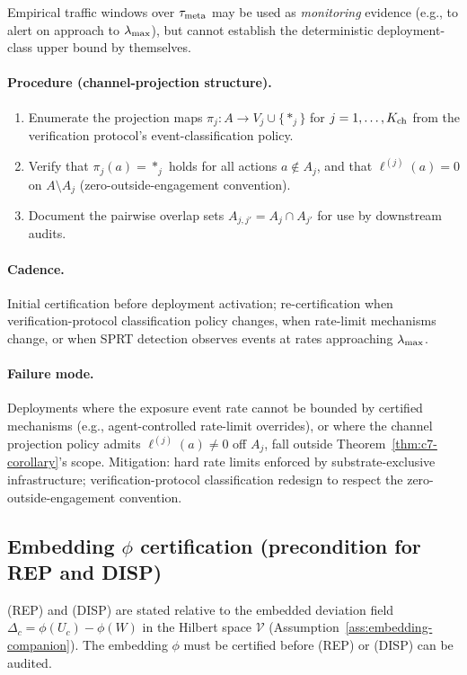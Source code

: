 Empirical traffic windows over $\tau_{\mathrm{meta}}$ may be used as
\emph{monitoring} evidence (e.g., to alert on approach to
$\lambda_{\max}$), but cannot establish the deterministic deployment-class
upper bound by themselves.

\paragraph{Procedure (channel-projection structure).}
\begin{enumerate}
\item Enumerate the projection maps $\pi_j: A \to V_j \cup
  \{*_j\}$ for $j = 1, \ldots, K_{\mathrm{ch}}$ from the verification
  protocol's event-classification policy.
\item Verify that $\pi_j(a) = *_j$ holds for all actions $a
  \notin A_j$, and that $\ell^{(j)}(a) = 0$ on $A \setminus A_j$
  (zero-outside-engagement convention).
\item Document the pairwise overlap sets $A_{j, j'} = A_j \cap
  A_{j'}$ for use by downstream audits.
\end{enumerate}

\paragraph{Cadence.} Initial certification before deployment
activation; re-certification when verification-protocol
classification policy changes, when rate-limit mechanisms
change, or when SPRT detection observes events at rates
approaching $\lambda_{\max}$.

\paragraph{Failure mode.} Deployments where the exposure event
rate cannot be bounded by certified mechanisms (e.g.,
agent-controlled rate-limit overrides), or where the channel
projection policy admits $\ell^{(j)}(a) \neq 0$ off $A_j$, fall
outside Theorem~\ref{thm:c7-corollary}'s scope. Mitigation: hard
rate limits enforced by substrate-exclusive infrastructure;
verification-protocol classification redesign to respect the
zero-outside-engagement convention.

\subsection{Embedding $\phi$ certification (precondition for REP and DISP)}

(REP) and (DISP) are stated relative to the embedded deviation
field $\Delta_c = \phi(U_c) - \phi(W)$ in the Hilbert space
$\mathcal{V}$ (Assumption~\ref{ass:embedding-companion}). The
embedding $\phi$ must be certified before (REP) or (DISP) can
be audited.

